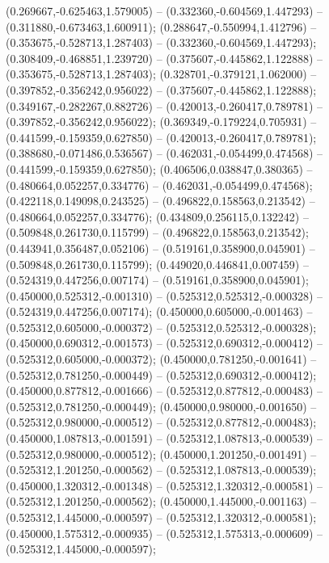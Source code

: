  (0.269667,-0.625463,1.579005) -- (0.332360,-0.604569,1.447293) -- (0.311880,-0.673463,1.600911);
 (0.288647,-0.550994,1.412796) -- (0.353675,-0.528713,1.287403) -- (0.332360,-0.604569,1.447293);
 (0.308409,-0.468851,1.239720) -- (0.375607,-0.445862,1.122888) -- (0.353675,-0.528713,1.287403);
 (0.328701,-0.379121,1.062000) -- (0.397852,-0.356242,0.956022) -- (0.375607,-0.445862,1.122888);
 (0.349167,-0.282267,0.882726) -- (0.420013,-0.260417,0.789781) -- (0.397852,-0.356242,0.956022);
 (0.369349,-0.179224,0.705931) -- (0.441599,-0.159359,0.627850) -- (0.420013,-0.260417,0.789781);
 (0.388680,-0.071486,0.536567) -- (0.462031,-0.054499,0.474568) -- (0.441599,-0.159359,0.627850);
 (0.406506,0.038847,0.380365) -- (0.480664,0.052257,0.334776) -- (0.462031,-0.054499,0.474568);
 (0.422118,0.149098,0.243525) -- (0.496822,0.158563,0.213542) -- (0.480664,0.052257,0.334776);
 (0.434809,0.256115,0.132242) -- (0.509848,0.261730,0.115799) -- (0.496822,0.158563,0.213542);
 (0.443941,0.356487,0.052106) -- (0.519161,0.358900,0.045901) -- (0.509848,0.261730,0.115799);
 (0.449020,0.446841,0.007459) -- (0.524319,0.447256,0.007174) -- (0.519161,0.358900,0.045901);
 (0.450000,0.525312,-0.001310) -- (0.525312,0.525312,-0.000328) -- (0.524319,0.447256,0.007174);
 (0.450000,0.605000,-0.001463) -- (0.525312,0.605000,-0.000372) -- (0.525312,0.525312,-0.000328);
 (0.450000,0.690312,-0.001573) -- (0.525312,0.690312,-0.000412) -- (0.525312,0.605000,-0.000372);
 (0.450000,0.781250,-0.001641) -- (0.525312,0.781250,-0.000449) -- (0.525312,0.690312,-0.000412);
 (0.450000,0.877812,-0.001666) -- (0.525312,0.877812,-0.000483) -- (0.525312,0.781250,-0.000449);
 (0.450000,0.980000,-0.001650) -- (0.525312,0.980000,-0.000512) -- (0.525312,0.877812,-0.000483);
 (0.450000,1.087813,-0.001591) -- (0.525312,1.087813,-0.000539) -- (0.525312,0.980000,-0.000512);
 (0.450000,1.201250,-0.001491) -- (0.525312,1.201250,-0.000562) -- (0.525312,1.087813,-0.000539);
 (0.450000,1.320312,-0.001348) -- (0.525312,1.320312,-0.000581) -- (0.525312,1.201250,-0.000562);
 (0.450000,1.445000,-0.001163) -- (0.525312,1.445000,-0.000597) -- (0.525312,1.320312,-0.000581);
 (0.450000,1.575312,-0.000935) -- (0.525312,1.575313,-0.000609) -- (0.525312,1.445000,-0.000597);
